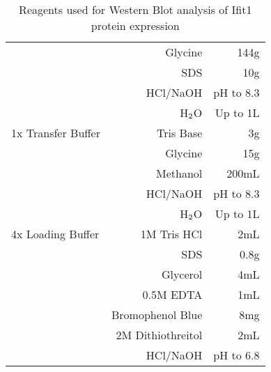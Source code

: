 \begin{table}[!htbp]
\begin{tabular}{lrr}
                                & Glycine                             & 144g  \\
                                & SDS                                 & 10g    \\
                                & HCl/NaOH                            & pH to 8.3 \\
                                & H$\textsubscript{2}$O               & Up to 1L  \\
  \hline
  1x Transfer Buffer            & Tris Base                           & 3g  \\
                                & Glycine                             & 15g  \\
                                & Methanol                            & 200mL    \\
                                & HCl/NaOH                            & pH to 8.3 \\
                                & H$\textsubscript{2}$O               & Up to 1L  \\
  \hline
  4x Loading Buffer             & 1M Tris HCl                         & 2mL \\
                                & SDS                                 & 0.8g \\
                                & Glycerol                            & 4mL \\
                                & 0.5M EDTA                           & 1mL \\
                                & Bromophenol Blue                    & 8mg \\
                                & 2M Dithiothreitol                   & 2mL \\
                                & HCl/NaOH                            & pH to 6.8 \\
\end{tabular}
\caption{Reagents used for Western Blot analysis of Ifit1 protein expression}
\label{tab:WBBuffers}
\end{table}

